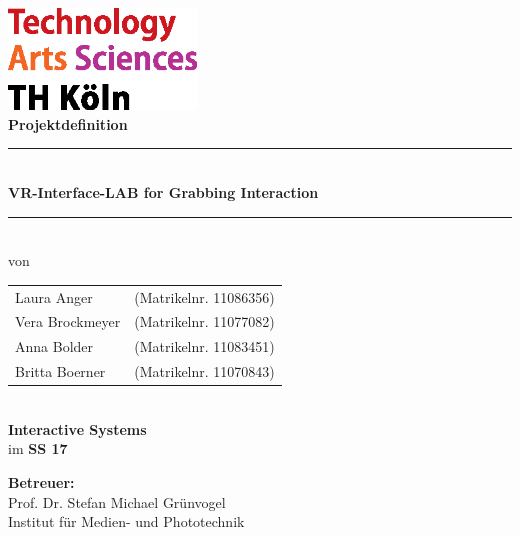 \thispagestyle{empty}
\begin{center}
			\includegraphics[width=5cm]{Bilder/logo_TH}\\[12ex]
			{\Huge\textbf{Projektdefinition}}\\[8ex]
			\rule{.8\textwidth}{.2pt}
			{\Large\\[1ex] \textbf{VR-Interface-LAB for Grabbing Interaction}}\\
			\rule{.8\textwidth}{.2pt}\\[10ex]
			von\\[2ex]
			\begin{tabular}{ll}
			Laura Anger &(Matrikelnr. 11086356)\\ 
			Vera Brockmeyer &(Matrikelnr. 11077082)\\
			Anna Bolder &(Matrikelnr. 11083451)\\
			Britta Boerner &(Matrikelnr. 11070843)\\
			\end{tabular}\\[10ex]
			\textbf{Interactive Systems}\\
			im \textbf{SS 17}\\			
			\end{center}
			\vfill
			\begin{flushleft}
			{\bf Betreuer:}\\
			Prof. Dr. Stefan Michael Grünvogel\\
			Institut für Medien- und Phototechnik
			\end{flushleft}
	\newpage